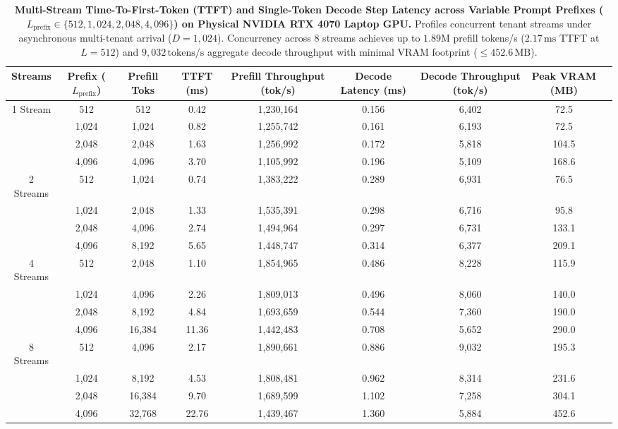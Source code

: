 \documentclass[journal]{IEEEtran}
\begin{document}
\begin{table}[t]
\centering
\small
\caption{\textbf{Multi-Stream Time-To-First-Token (TTFT) and Single-Token Decode Step Latency across Variable Prompt Prefixes ($L_{\text{prefix}} \in \{512, 1{,}024, 2{,}048, 4{,}096\}$) on Physical NVIDIA RTX 4070 Laptop GPU.} Profiles concurrent tenant streams under asynchronous multi-tenant arrival ($D=1{,}024$). Concurrency across 8 streams achieves up to $1.89\text{M}$ prefill tokens/s ($2.17\,\text{ms}$ TTFT at $L=512$) and $9{,}032\,\text{tokens/s}$ aggregate decode throughput with minimal VRAM footprint ($\le 452.6\,\text{MB}$).}
\label{tab:ttft_decode_benchmarks}
\begin{tabular}{ccccccccc}
\toprule
\textbf{Streams} & \textbf{Prefix ($L_{\text{prefix}}$)} & \textbf{Prefill Toks} & \textbf{TTFT (ms)} & \textbf{Prefill Throughput (tok/s)} & \textbf{Decode Latency (ms)} & \textbf{Decode Throughput (tok/s)} & \textbf{Peak VRAM (MB)} \\
\midrule
1 Stream     & 512      & 512      & 0.42 & 1,230,164 & 0.156 & 6,402 & 72.5 \\
             & 1,024    & 1,024    & 0.82 & 1,255,742 & 0.161 & 6,193 & 72.5 \\
             & 2,048    & 2,048    & 1.63 & 1,256,992 & 0.172 & 5,818 & 104.5 \\
             & 4,096    & 4,096    & 3.70 & 1,105,992 & 0.196 & 5,109 & 168.6 \\
\midrule
2 Streams    & 512      & 1,024    & 0.74 & 1,383,222 & 0.289 & 6,931 & 76.5 \\
             & 1,024    & 2,048    & 1.33 & 1,535,391 & 0.298 & 6,716 & 95.8 \\
             & 2,048    & 4,096    & 2.74 & 1,494,964 & 0.297 & 6,731 & 133.1 \\
             & 4,096    & 8,192    & 5.65 & 1,448,747 & 0.314 & 6,377 & 209.1 \\
\midrule
4 Streams    & 512      & 2,048    & 1.10 & 1,854,965 & 0.486 & 8,228 & 115.9 \\
             & 1,024    & 4,096    & 2.26 & 1,809,013 & 0.496 & 8,060 & 140.0 \\
             & 2,048    & 8,192    & 4.84 & 1,693,659 & 0.544 & 7,360 & 190.0 \\
             & 4,096    & 16,384   & 11.36 & 1,442,483 & 0.708 & 5,652 & 290.0 \\
\midrule
8 Streams    & 512      & 4,096    & 2.17 & 1,890,661 & 0.886 & 9,032 & 195.3 \\
             & 1,024    & 8,192    & 4.53 & 1,808,481 & 0.962 & 8,314 & 231.6 \\
             & 2,048    & 16,384   & 9.70 & 1,689,599 & 1.102 & 7,258 & 304.1 \\
             & 4,096    & 32,768   & 22.76 & 1,439,467 & 1.360 & 5,884 & 452.6 \\
\bottomrule
\end{tabular}
\end{table}
\end{document}
